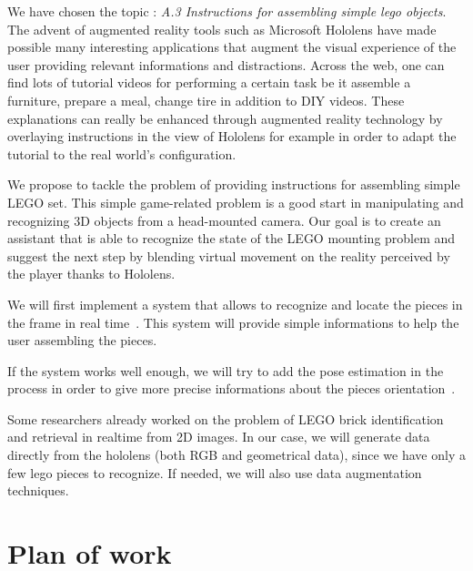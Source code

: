 \documentclass[a4paper,10pt]{article}
\begin{document}
\newpage

We have chosen the topic : \emph{A.3 Instructions for assembling simple lego objects}.
\smallbreak
The advent of augmented reality tools such as Microsoft Hololens have made possible many interesting 
applications that augment the visual experience of the user providing relevant informations and 
distractions. Across the web, one can find lots of tutorial videos for performing a certain task be it 
assemble a furniture, prepare a meal, change tire in addition to DIY videos. These explanations can 
really be enhanced through augmented reality technology by overlaying instructions in the view of Hololens 
for example in order to adapt the tutorial to the real world’s configuration. 
\smallbreak

We propose to tackle the problem of providing instructions for assembling simple LEGO set. This simple 
game-related problem is a good start in manipulating and recognizing 3D objects from a head-mounted camera. 
Our goal is to create an assistant that is able to recognize the state of the LEGO mounting problem and 
suggest the next step by blending virtual movement on the reality perceived by the player thanks to 
Hololens.

\smallbreak

We will first implement a system that allows to recognize and locate the pieces in the frame in real time~\cite{redmon_you_2015}. 
This system will provide simple informations to help the user assembling the pieces.

If the system works well enough, we will try to add the pose estimation in the process in order to give 
more precise informations about the pieces orientation~\cite{wohlhart_learning_2015}.

\smallbreak
Some researchers already worked on the problem of LEGO brick identification and retrieval in realtime from 
2D images\cite{botha_realtime_2009}. In our case, we will generate data directly from the hololens (both 
RGB and geometrical data), since we have only a few lego pieces to recognize. If needed, we will also use 
data augmentation techniques. 
 
\section{Plan of work}
\end{document}
